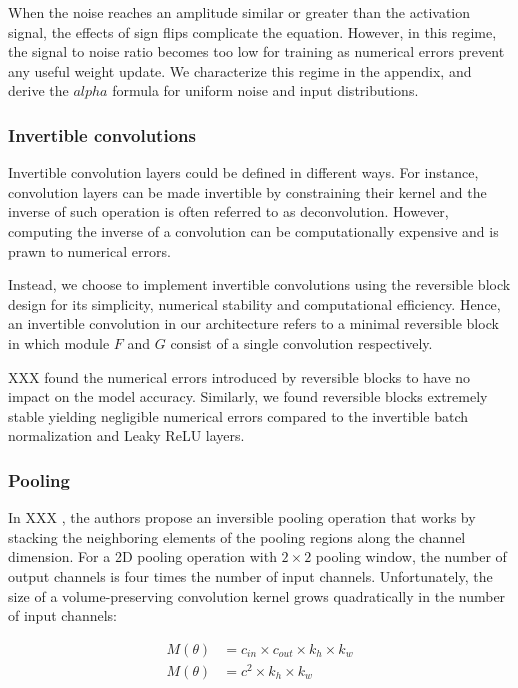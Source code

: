 \documentclass[twocolumn]{bmcart}
\begin{document}
When the noise reaches an amplitude similar or greater than the activation signal, the effects of sign flips complicate the equation. However, in this regime, the signal to noise ratio becomes too low for training as numerical errors prevent any useful weight update.
We characterize this regime in the appendix, and derive the $alpha$ formula for uniform noise and input distributions.

\subsubsection{Invertible convolutions}

Invertible convolution layers could be defined in different ways.
For instance, convolution layers can be made invertible by constraining their kernel and the inverse of such operation is often referred to as deconvolution. 
However, computing the inverse of a convolution can be computationally expensive and is  prawn to numerical errors.

Instead, we choose to implement invertible convolutions using the reversible block design for its simplicity, numerical stability and computational efficiency.
Hence, an invertible convolution in our architecture refers to a minimal reversible block in which module $F$ and $G$ consist of a single convolution respectively.

XXX \etal found the numerical errors introduced by reversible blocks to have no impact on the model accuracy. 
Similarly, we found reversible blocks extremely stable yielding negligible numerical errors 
compared to the invertible batch normalization and Leaky ReLU layers.

\subsubsection{Pooling}

In XXX \etal, the authors propose an inversible pooling operation that works by stacking the neighboring elements of the pooling regions along the channel dimension.
For a 2D pooling operation with $2 \times 2$ pooling window, the number of output channels is four times the number of input channels. 
Unfortunately, the size of a volume-preserving convolution kernel grows quadratically in the number of input channels:

\begin{subequations}
\begin{align}
M(\theta) &= c_{in} \times c_{out} \times k_h \times k_w \\
M(\theta) &= c^2 \times k_h \times k_w
\end{align}
\end{subequations}
\end{document}
